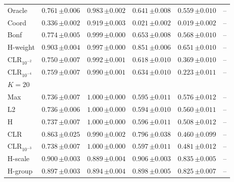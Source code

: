 \begin{tabular}{lccccc}
Oracle & $0.761\,{\scriptstyle\pm 0.006}$ & $0.983\,{\scriptstyle\pm 0.002}$ & $0.641\,{\scriptstyle\pm 0.008}$ & $0.559\,{\scriptstyle\pm 0.010}$ & -- \\
Coord & $0.336\,{\scriptstyle\pm 0.002}$ & $0.919\,{\scriptstyle\pm 0.003}$ & $0.021\,{\scriptstyle\pm 0.002}$ & $0.019\,{\scriptstyle\pm 0.002}$ & -- \\
Bonf & $0.774\,{\scriptstyle\pm 0.005}$ & $0.999\,{\scriptstyle\pm 0.000}$ & $0.653\,{\scriptstyle\pm 0.008}$ & $0.568\,{\scriptstyle\pm 0.010}$ & -- \\
H-weight & $0.903\,{\scriptstyle\pm 0.004}$ & $0.997\,{\scriptstyle\pm 0.000}$ & $0.851\,{\scriptstyle\pm 0.006}$ & $0.651\,{\scriptstyle\pm 0.010}$ & -- \\
CLR$_{10^{-2}}$ & $0.750\,{\scriptstyle\pm 0.007}$ & $0.992\,{\scriptstyle\pm 0.001}$ & $0.618\,{\scriptstyle\pm 0.010}$ & $0.369\,{\scriptstyle\pm 0.010}$ & -- \\
CLR$_{10^{-4}}$ & $0.759\,{\scriptstyle\pm 0.007}$ & $0.990\,{\scriptstyle\pm 0.001}$ & $0.634\,{\scriptstyle\pm 0.010}$ & $0.223\,{\scriptstyle\pm 0.011}$ & -- \\
\midrule
\multicolumn{6}{l}{$K=20$} \\
Max & $0.736\,{\scriptstyle\pm 0.007}$ & $1.000\,{\scriptstyle\pm 0.000}$ & $0.595\,{\scriptstyle\pm 0.011}$ & $0.576\,{\scriptstyle\pm 0.012}$ & -- \\
L2 & $0.736\,{\scriptstyle\pm 0.006}$ & $1.000\,{\scriptstyle\pm 0.000}$ & $0.594\,{\scriptstyle\pm 0.010}$ & $0.560\,{\scriptstyle\pm 0.011}$ & -- \\
H & $0.737\,{\scriptstyle\pm 0.007}$ & $1.000\,{\scriptstyle\pm 0.000}$ & $0.596\,{\scriptstyle\pm 0.011}$ & $0.508\,{\scriptstyle\pm 0.012}$ & -- \\
CLR & $0.863\,{\scriptstyle\pm 0.025}$ & $0.990\,{\scriptstyle\pm 0.002}$ & $0.796\,{\scriptstyle\pm 0.038}$ & $0.460\,{\scriptstyle\pm 0.099}$ & -- \\
CLR$_{10^{-3}}$ & $0.738\,{\scriptstyle\pm 0.007}$ & $1.000\,{\scriptstyle\pm 0.000}$ & $0.597\,{\scriptstyle\pm 0.011}$ & $0.481\,{\scriptstyle\pm 0.012}$ & -- \\
H-scale & $0.900\,{\scriptstyle\pm 0.003}$ & $0.889\,{\scriptstyle\pm 0.004}$ & $0.906\,{\scriptstyle\pm 0.003}$ & $0.835\,{\scriptstyle\pm 0.005}$ & -- \\
H-group & $0.897\,{\scriptstyle\pm 0.003}$ & $0.894\,{\scriptstyle\pm 0.004}$ & $0.898\,{\scriptstyle\pm 0.005}$ & $0.825\,{\scriptstyle\pm 0.007}$ & -- \\

\end{tabular}
